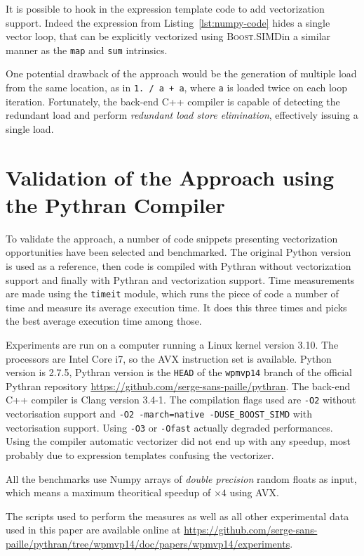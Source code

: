 \documentclass[preprint]{sigplanconf}
\providecommand{\boostsimd}{\textsc{Boost.SIMD}}
\begin{document}
It is possible to hook in the expression template code to add vectorization support.
Indeed the expression from Listing~\ref{lst:numpy-code} hides a single vector
loop, that can be explicitly vectorized using \boostsimd in a similar manner as
the \texttt{map} and \texttt{sum} intrinsics.

One potential drawback of the approach would be the generation of multiple load
from the same location, as in \texttt{1. / a + a}, where \texttt{a} is loaded
twice on each loop iteration. Fortunately, the back-end C++ compiler is capable
of detecting the redundant load and perform \emph{redundant load store
elimination}, effectively issuing a single load.

\section{Validation of the Approach using the Pythran Compiler}
\label{sec:benchs}

To validate the approach, a number of code snippets presenting vectorization
opportunities have been selected and benchmarked. The original Python version
is used as a reference, then code is compiled with Pythran without
vectorization support and finally with Pythran and vectorization support. Time
measurements are made using the \texttt{timeit} module, which runs the piece of
code a number of time and measure its average execution time. It does this
three times and picks the best average execution time among those.

Experiments are run on a computer running a Linux kernel version 3.10. The
processors are Intel Core i7, so the AVX instruction set is available. Python
version is 2.7.5, Pythran version is the \texttt{HEAD} of the \texttt{wpmvp14}
branch of the official Pythran repository
\url{https://github.com/serge-sans-paille/pythran}. The back-end C++ compiler
is Clang version 3.4-1. The compilation flags used are \texttt{-O2} without
vectorisation support and \texttt{-O2 -march=native -DUSE\_BOOST\_SIMD} with
vectorisation support. Using \texttt{-O3} or \texttt{-Ofast} actually degraded
performances. Using the compiler automatic vectorizer did not end up with any
speedup, most probably due to expression templates confusing the vectorizer.

All the benchmarks use Numpy arrays of \emph{double precision} random floats as
input, which means a maximum theoritical speedup of $\times4$ using AVX. 

The scripts used to perform the measures as well as all other experimental data
used in this paper are available online at
\url{https://github.com/serge-sans-paille/pythran/tree/wpmvp14/doc/papers/wpmvp14/experiments}.
\end{document}
